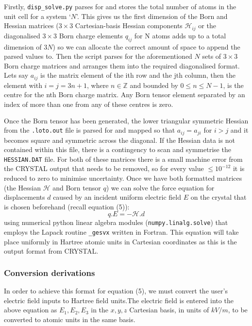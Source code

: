 \documentclass[10pt]{article}
\begin{document}
Firstly, \texttt{disp\_solve.py} parses for and stores the total number of atoms in the unit cell for a system `$N$'. This gives us the first dimension of the Born and Hessian matrices ($3\times 3$ Cartesian-basis Hessian components $\mathcal{H}_{ij}$ or the diagonalised $3\times 3$ Born charge elements $q_{ij}$ for N atoms adds up to a total dimension of $3N$) so we can allocate the correct amount of space to append the parsed values to. Then the script parses for the aforementioned $N$ sets of $3\times3$ Born charge matrices and arranges them into the required diagonalised format. Lets say $a_{ij}$ is the matrix element of the ith row and the jth column, then the element with $i = j = 3n+1$, where $n \in \mathbb{Z}$ and bounded by $0 \leq n \leq N-1$, is the centre for the nth Born charge matrix. Any Born tensor element separated by an index of more than one from any of these centres is zero.

Once the Born tensor has been generated, the lower triangular symmetric Hessian from the \texttt{.loto.out} file is parsed for and mapped so that $a_{ij} = a_{ji}$ for $i > j$ and it becomes square and symmetric across the diagonal. If the Hessian data is not contained within this file, there is a contingency to scan and symmetrise the \texttt{HESSIAN.DAT} file. For both of these matrices there is a small machine error from the CRYSTAL output that needs to be removed, so for every value $\leq 10^{-12}$ it is reduced to zero to minimise uncertainty. Once we have both formatted matrices (the Hessian $\mathcal{H}$ and Born tensor $q$) we can solve the force equation for displacements $d$ caused by an incident uniform electric field $E$ on the crystal that is chosen beforehand (recall equation (5)):
\begin{equation*}
q.E = -\mathcal{H}.d
\end{equation*}
using numerical python linear algebra modules (\texttt{numpy.linalg.solve}) that employs the Lapack routine \texttt{\_gesvx} written in Fortran. This equation will take place uniformly in Hartree atomic units in Cartesian coordinates as this is the output format from CRYSTAL.

\subsubsection{Conversion derivations}
In order to achieve this format for equation (5), we must convert the user's electric field inputs to Hartree field units.The electric field is entered into the above equation as $E_1, E_2, E_3$ in the $x, y, z$ Cartesian basis, in units of $kV/m$, to be converted to atomic units in the same basis. 
\end{document}
